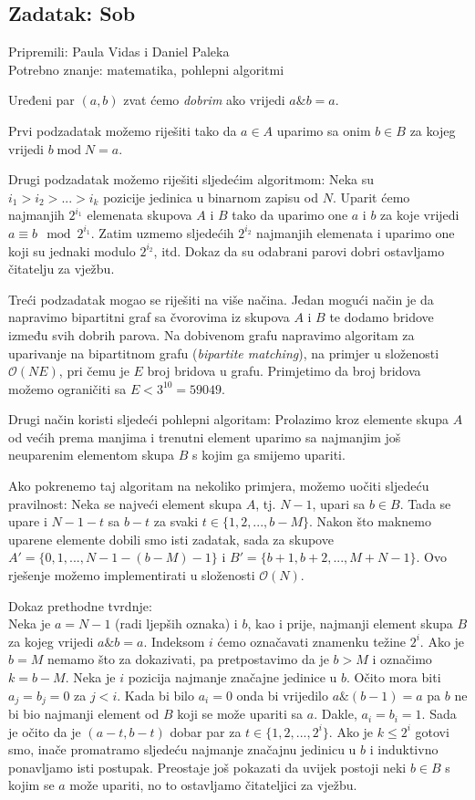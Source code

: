 \documentclass[a4paper]{article}
\begin{document}
\clearpage

\subsection*{Zadatak: Sob}
\textsf{Pripremili: Paula Vidas i Daniel Paleka}\\
\textsf{Potrebno znanje: matematika, pohlepni algoritmi}

Uređeni par $(a, b)$ zvat ćemo \emph{dobrim} ako vrijedi $a \mathbin\& b = a$.

Prvi podzadatak možemo riješiti tako da $a \in A$ uparimo sa onim $b \in B$ za
kojeg vrijedi $b \mathbin{\textrm{mod}} N = a$.

Drugi podzadatak možemo riješiti sljedećim algoritmom: Neka su
$i_1 > i_2 > ... > i_k$ pozicije jedinica u binarnom zapisu od $N$. Uparit ćemo
najmanjih $2^{i_1}$ elemenata skupova $A$ i $B$ tako da uparimo one $a$ i $b$
za koje vrijedi $a \equiv b \mod 2^{i_1}$. Zatim uzmemo sljedećih $2^{i_2}$
najmanjih elemenata i uparimo one koji su jednaki modulo $2^{i_2}$, itd.
Dokaz da su odabrani parovi dobri ostavljamo čitatelju za vježbu.

Treći podzadatak mogao se riješiti na više načina. Jedan mogući način je da
napravimo bipartitni graf sa čvorovima iz skupova $A$ i $B$ te dodamo bridove
između svih dobrih parova. Na dobivenom grafu napravimo algoritam za uparivanje
na bipartitnom grafu (\emph{bipartite matching}), na primjer u složenosti
$\mathcal{O}(NE)$, pri čemu je $E$ broj bridova u grafu.
Primjetimo da broj bridova možemo ograničiti sa $E < 3^{10} = 59049$.

Drugi način koristi sljedeći pohlepni algoritam: Prolazimo kroz elemente skupa
$A$ od većih prema manjima i trenutni element uparimo sa najmanjim još
neuparenim elementom skupa $B$ s kojim ga smijemo upariti.

Ako pokrenemo taj algoritam na nekoliko primjera, možemo uočiti sljedeću
pravilnost: Neka se najveći element skupa $A$, tj. $N - 1$, upari sa $b \in B$.
Tada se upare i $N - 1 - t$ sa $b - t$ za svaki $t \in \{1, 2, ..., b - M\}$.
Nakon što maknemo uparene elemente dobili smo isti zadatak, sada za skupove
$A' = \{0, 1, ..., N - 1 - (b - M) - 1\}$ i
$B' = \{b + 1, b + 2, ..., M + N - 1\}$. Ovo rješenje možemo implementirati u
složenosti $\mathcal{O}(N)$.

Dokaz prethodne tvrdnje:\\
Neka je $a = N - 1$ (radi ljepših oznaka) i $b$, kao i prije, najmanji element
skupa $B$ za kojeg vrijedi $a \mathbin\& b = a$. Indeksom $i$ ćemo označavati znamenku
težine $2^i$. Ako je $b = M$ nemamo što za dokazivati, pa pretpostavimo da je
$b > M$ i označimo $k = b - M$. Neka je $i$ pozicija najmanje značajne jedinice u $b$.
Očito mora biti $a_j = b_j = 0$ za $j < i$. Kada bi bilo $a_i = 0$ onda bi vrijedilo
$a \mathbin\& (b - 1) = a$ pa $b$ ne bi bio najmanji element od $B$ koji se može upariti
sa $a$. Dakle, $a_i = b_i = 1$. Sada je očito da je $(a - t, b - t)$ dobar par za
$t \in \{1, 2, ..., 2^i\}$. Ako je $k \leq 2^i$ gotovi smo, inače promatramo sljedeću
najmanje značajnu jedinicu u $b$ i induktivno ponavljamo isti postupak.
Preostaje još pokazati da uvijek postoji neki $b \in B$ s kojim se $a$ može upariti, no
to ostavljamo čitateljici za vježbu.
\end{document}
